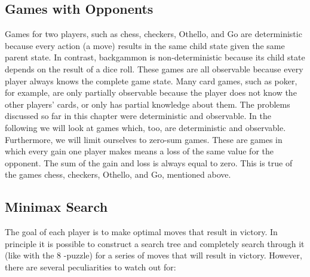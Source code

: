 \documentclass[10pt]{book}
\begin{document}
\subsection{Games with Opponents}
Games for two players, such as chess, checkers, Othello, and Go are deterministic because every action (a move) results in the same child state given the same parent state. In contrast, backgammon is non-deterministic because its child state depends on the result of a dice roll. These games are all observable because every player always knows the complete game state. Many card games, such as poker, for example, are only partially observable because the player does not know the other players' cards, or only has partial knowledge about them.
The problems discussed so far in this chapter were deterministic and observable. In the following we will look at games which, too, are deterministic and observable. Furthermore, we will limit ourselves to zero-sum games. These are games in which every gain one player makes means a loss of the same value for the opponent. The sum of the gain and loss is always equal to zero. This is true of the games chess, checkers, Othello, and Go, mentioned above.

\subsection{Minimax Search}
The goal of each player is to make optimal moves that result in victory. In principle it is possible to construct a search tree and completely search through it (like with the 8 -puzzle) for a series of moves that will result in victory. However, there are several peculiarities to watch out for:
\end{document}
